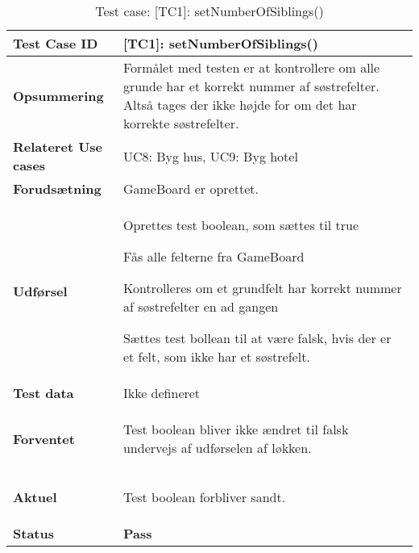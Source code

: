 \documentclass[class=article, crop=false]{standalone}
\makeatletter
\let\savespace\@minipagetrue
\makeatother
\begin{document}
    \begin{table}[H]
        \caption{Test case: [TC1]: setNumberOfSiblings()}
        \begin{tabularx}{\textwidth}{|l|X|}
            \hline
            \textbf{Test Case ID }       & \textbf{[TC1]: setNumberOfSiblings()}   \\ \hline
            \textbf{Opsummering}         & Formålet med testen er at kontrollere om alle grunde har et korrekt nummer af søstrefelter.
                                            Altså tages der ikke højde for om det har korrekte søstrefelter. \\ \hline
            \textbf{Relateret Use cases}     & UC8: Byg hus, UC9: Byg hotel      \\ \hline
            \textbf{Forudsætning}& GameBoard er oprettet.\\ \hline
            \textbf{Udførsel}            & \begin{tabenum}
                                               \item Oprettes test boolean, som sættes til true
                                               \item Fås alle felterne fra GameBoard
                                               \item Kontrolleres om et grundfelt har korrekt nummer af søstrefelter en ad gangen
                                               \item Sættes test bollean til at være falsk, hvis der er et felt, som ikke har et søstrefelt.
            \end{tabenum} \\ \hline
            \textbf{Test data}           &  Ikke defineret  \\ \hline
            \textbf{Forventet} & \savespace \begin{compactitem}
                                     \item Test boolean bliver ikke ændret til falsk undervejs af udførselen af løkken.
                                     \end{compactitem} \savespace \\    \hline
            \textbf{Aktuel} & \begin{tabenum}
                                  \item Test boolean forbliver sandt.
            \end{tabenum}   \\ \hline
            \textbf{Status} & \textbf{Pass} \\ \hline

\end{tabularx}
\end{table}
\end{document}
